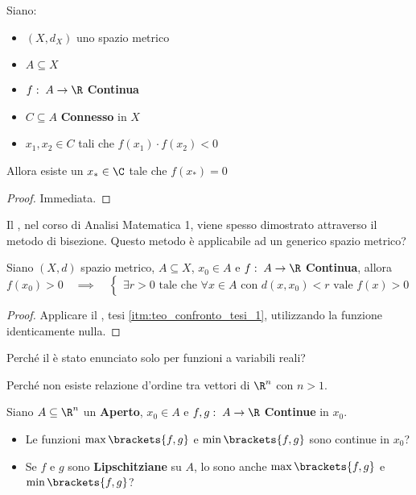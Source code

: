 \begin{corollary}
	\label{coro:f_in_conn_passa_per_0}
	Siano:
	\begin{itemize}[noitemsep]
		\item $(X,d_X)$ uno spazio metrico
		\item $A \subseteq X$
		\item $f:\; A \to \R$ \textbf{Continua}
		\item $C \subseteq A$ \textbf{Connesso} in $X$
		\item $x_1, x_2 \in C$ tali che $f(x_1) \cdot f(x_2) < 0$
	\end{itemize}
	Allora esiste un $x_* \in \C$ tale che $f(x_*) = 0$
	\begin{proof}
		Immediata.
	\end{proof}
\end{corollary}
\begin{exercise}
	Il , nel corso di Analisi Matematica 1, viene spesso dimostrato attraverso il metodo di bisezione. Questo metodo è applicabile ad un generico spazio metrico?
\end{exercise}
\begin{theorem}
	\label{teo:perman_segno}
	Siano $(X,d)$ spazio metrico, $A \subseteq X$, $x_0 \in A$ e $f:\; A \to \R$ \textbf{Continua}, allora
	\[
		f(x_0) > 0
		\quad \implies \quad
		\begin{cases}
			\exists r > 0 \text{ tale che } \forall x \in A \text{ con } d(x, x_0) < r \text{ vale } f(x) > 0
		\end{cases}
	\]
	\begin{proof}
		Applicare il , tesi \ref{itm:teo_confronto_tesi_1}, utilizzando la funzione identicamente nulla.
	\end{proof}
\end{theorem}
\begin{exercise}
	Perché il  è stato enunciato solo per funzioni a variabili reali?
	\begin{solution}
		Perché non esiste relazione d'ordine tra vettori di $\R^n$ con $n > 1$.
	\end{solution}
\end{exercise}
\begin{exercise}
	\label{ex:se_fg_lips_max_fg_lips}
	Siano $A \subseteq \R^n$ un \textbf{Aperto}, $x_0 \in A$ e $f,g:\; A \to \R$ \textbf{Continue} in $x_0$.
	\begin{itemize}
		\item Le funzioni $\max \brackets{f, g}$ e $\min \brackets{f, g}$ sono continue in $x_0$?
		\item Se $f$ e $g$ sono \textbf{Lipschitziane} su $A$, lo sono anche $\max \brackets{f, g}$ e $\min \brackets{f, g}$?
	\end{itemize}
\end{exercise}
